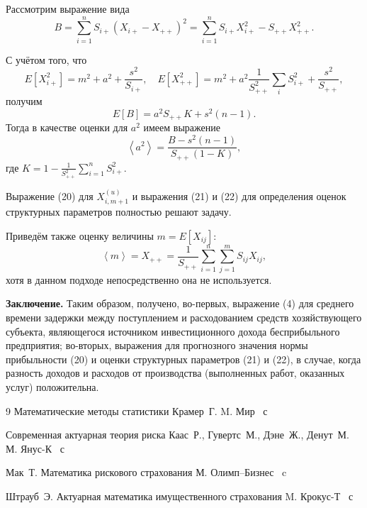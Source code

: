 Рассмотрим выражение вида
$$
B=\sum_{i=1}^n {S_{i+} \left( {X_{i+} -X_{++} } \right)^2} =\sum_{i=1}^n {S_{i+} X_{i+}^2 -S_{++} X_{++}^2 } .$$

С учётом того, что
\[
E\left[ {X_{i+}^2 } \right]=m^2+a^2+\frac{s^2}{S_{i+} },
\quad
E\left[ {X_{++}^2 } \right]=m^2+a^2\frac{1}{S_{++}^2 }\sum_i
{S_{i+}^2 } +\frac{s^2}{S_{++} } ,
\]
получим
\[
E\left[ B \right]=a^2S_{++} K+s^2\left( {n-1} \right).
\]
Тогда в качестве оценки для $a^2$ имеем выражение
\begin{equation}
\left\langle {a^2} \right\rangle =\frac{B-s^2\left( {n-1} \right)}{S_{++} \left( {1-K} \right)},
\end{equation}
где $\displaystyle K=1-\frac{1}{S_{++}^2 }\sum_{i=1}^n {S_{i+}^2 } $.

Выражение (20) для $X_{i, m+1}^{(u)} $ и выражения (21) и (22) для
определения оценок структурных параметров полностью решают задачу.

Приведём также оценку величины $m=E\left[ {X_{ij} } \right]$:
$$\displaystyle \left\langle m \right\rangle =X_{++} =\frac{1}{S_{++} }\sum_{i=1}^n
{\sum_{j=1}^m {S_{ij} X_{ij} } } ,$$ хотя в данном подходе
непосредственно она не используется.

{\bf Заключение.}
Таким образом, получено, во-первых, выражение (4) для
среднего времени задержки между поступлением и расходованием средств
хозяйствующего субъекта, являющегося источником инвестиционного дохода
бесприбыльного предприятия; во-вторых, выражения для прогнозного значения
нормы прибыльности (20) и оценки структурных параметров (21) и (22), в
случае, когда разность доходов и расходов от производства (выполненных
работ, оказанных услуг) положительна.


\begin{thebibliography}{9}
\book Математические методы статистики
\by  Крамер~Г.
\publaddr M.
\publ Мир
~с

\book  Современная актуарная теория риска
\by  Каас~Р., Гувертс~М., Дэне~Ж., Денут~М.
\publaddr  М.
\publ Янус-К
~с

\by Мак~Т.
\book Математика рискового страхования
\publaddr  М.
\publ Олимп--Бизнес
~c



\by Штрауб~Э.
\book Актуарная математика имущественного страхования
\publaddr M.
\publ Крокус-Т
~с

\end{thebibliography}
\newpage




\makeengtitlem
%
% 
